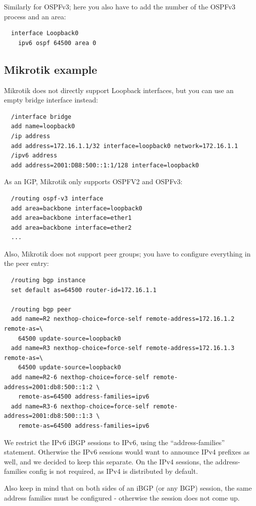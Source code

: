 Similarly for OSPFv3; here you also have to add the number of the OSPFv3 process and an area:
\begin{verbatim}
  interface Loopback0
    ipv6 ospf 64500 area 0
\end{verbatim}

\subsection{Mikrotik example}
Mikrotik does not directly support Loopback interfaces, but you can use an empty bridge interface instead:
\begin{verbatim}
  /interface bridge
  add name=loopback0
  /ip address
  add address=172.16.1.1/32 interface=loopback0 network=172.16.1.1
  /ipv6 address
  add address=2001:DB8:500::1:1/128 interface=loopback0
\end{verbatim}

As an \gls{IGP}, Mikrotik only supports OSPFV2 and OSPFv3:
\begin{verbatim}
  /routing ospf-v3 interface
  add area=backbone interface=loopback0
  add area=backbone interface=ether1
  add area=backbone interface=ether2
  ...
\end{verbatim}

Also, Mikrotik does not support peer groups; you have to configure everything in the peer entry:
\begin{verbatim}
  /routing bgp instance
  set default as=64500 router-id=172.16.1.1

  /routing bgp peer
  add name=R2 nexthop-choice=force-self remote-address=172.16.1.2 remote-as=\
    64500 update-source=loopback0
  add name=R3 nexthop-choice=force-self remote-address=172.16.1.3 remote-as=\
    64500 update-source=loopback0
  add name=R2-6 nexthop-choice=force-self remote-address=2001:db8:500::1:2 \
    remote-as=64500 address-families=ipv6
  add name=R3-6 nexthop-choice=force-self remote-address=2001:db8:500::1:3 \
    remote-as=64500 address-families=ipv6
\end{verbatim}

We restrict the IPv6 iBGP sessions to IPv6, using the ``address-families'' statement. Otherwise the IPv6 sessions would want to announce IPv4 prefixes as well, and we decided to keep this separate. On the IPv4 sessions, the address-families config is not required, as IPv4 is distributed by default.

Also keep in mind that on both sides of an iBGP (or any BGP) session, the same address families must be configured - otherwise the session does not come up.

